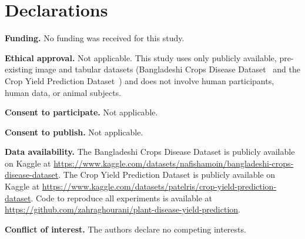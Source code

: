 \section*{Declarations}

\noindent\textbf{Funding.} No funding was received for this study.

\noindent\textbf{Ethical approval.} Not applicable. This study uses
only publicly available, pre-existing image and tabular datasets
(Bangladeshi Crops Disease Dataset~\cite{bangladesh_dataset} and
the Crop Yield Prediction Dataset~\cite{kaggle_yield}) and does not
involve human participants, human data, or animal subjects.

\noindent\textbf{Consent to participate.} Not applicable.

\noindent\textbf{Consent to publish.} Not applicable.

\noindent\textbf{Data availability.} The Bangladeshi Crops Disease
Dataset is publicly available on Kaggle at
\url{https://www.kaggle.com/datasets/nafishamoin/bangladeshi-crops-disease-dataset}.
The Crop Yield Prediction Dataset is publicly available on Kaggle at
\url{https://www.kaggle.com/datasets/patelris/crop-yield-prediction-dataset}.
Code to reproduce all experiments is available at
\url{https://github.com/zahraghourani/plant-disease-yield-prediction}.

\noindent\textbf{Conflict of interest.} The authors declare no
competing interests.
